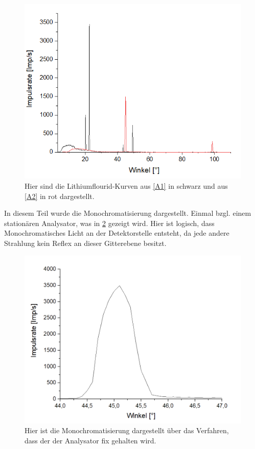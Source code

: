\documentclass[
	a4paper,
	12pt,
	pagesize,
	ngerman
]{scrartcl}
\begin{document}
\begin{figure}[h!]
    \centering
    \includegraphics[scale = 1]{mono-norlif.png}
    \caption{Hier sind die Lithiumflourid-Kurven aus \cref{A1} in schwarz und aus \cref{A2} in rot dargestellt.}
    \label{A4}
\end{figure}
In diesem Teil wurde die Monochromatisierung dargestellt. Einmal bzgl. einem stationären Analysator, was in \cref{A6} gezeigt wird. Hier ist logisch, dass Monochromatisches Licht an der Detektorstelle entsteht, da jede andere Strahlung kein Reflex an dieser Gitterebene besitzt.
\begin{figure}[h!]
    \centering
    \includegraphics[scale = 0.6]{fest.png}
    \caption{Hier ist die Monochromatisierung dargestellt über das Verfahren, dass der der Analysator fix gehalten wird.}
    \label{A6}
\end{figure}
\end{document}
